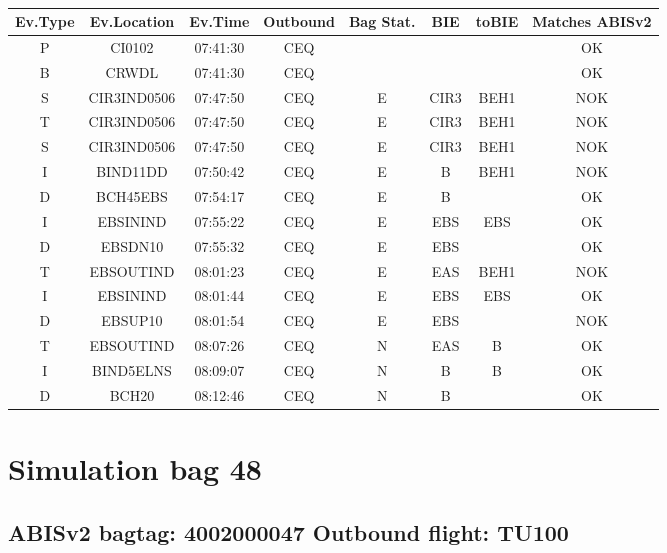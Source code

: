 \documentclass{report}
\begin{document}
\paragraph{}
\begin{longtable}{cccccccc}    \toprule
\rowcolor{white!50}
\textbf{Ev.Type} & \textbf{Ev.Location} & \textbf{Ev.Time} & \textbf{Outbound} & \textbf{Bag Stat.} & \textbf{BIE} & \textbf{toBIE} & \textbf{Matches ABISv2} \\\midrule
P & CI0102 & 07:41:30  & CEQ &  &  &  & OK\\
B & CRWDL & 07:41:30  & CEQ &  &  &  & OK\\
S & CIR3IND0506 & 07:47:50  & CEQ & E & CIR3 & BEH1 & NOK\\
T & CIR3IND0506 & 07:47:50  & CEQ & E & CIR3 & BEH1 & NOK\\
S & CIR3IND0506 & 07:47:50  & CEQ & E & CIR3 & BEH1 & NOK\\
I & BIND11DD & 07:50:42  & CEQ & E & B & BEH1 & NOK\\
D & BCH45EBS & 07:54:17  & CEQ & E & B &  & OK\\
I & EBSININD & 07:55:22  & CEQ & E & EBS & EBS & OK\\
D & EBSDN10 & 07:55:32  & CEQ & E & EBS &  & OK\\
T & EBSOUTIND & 08:01:23  & CEQ & E & EAS & BEH1 & NOK\\
I & EBSININD & 08:01:44  & CEQ & E & EBS & EBS & OK\\
D & EBSUP10 & 08:01:54  & CEQ & E & EBS &  & NOK\\
T & EBSOUTIND & 08:07:26  & CEQ & N & EAS & B & OK\\
I & BIND5ELNS & 08:09:07  & CEQ & N & B & B & OK\\
D & BCH20 & 08:12:46  & CEQ & N & B &  & OK\\
\bottomrule
\end{longtable}
\pagebreak
\section*{Simulation bag 48}
\subsection*{ABISv2 bagtag: 4002000047 Outbound flight: TU100}
\end{document}
